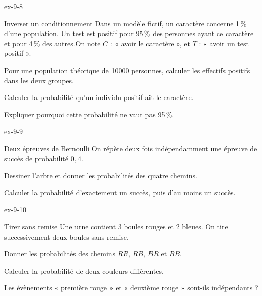 \begin{blocLivre}{ex-9-8}
\begin{exercice}[2]{Inverser un conditionnement}
Dans un modèle fictif, un caractère concerne 1\,\% d’une population. Un test est positif pour 95\,\% des personnes ayant ce caractère et pour 4\,\% des autres.On note $C$ : « avoir le caractère », et $T$ : « avoir un test positif ».\begin{questions}
\item Pour une population théorique de 10000 personnes, calculer les effectifs positifs dans les deux groupes.
\item Calculer la probabilité qu’un individu positif ait le caractère.
\item Expliquer pourquoi cette probabilité ne vaut pas 95\,\%.
\end{questions}
\label{figlivre-r09-08-ex}

\end{exercice}
\end{blocLivre}
\begin{blocLivre}{ex-9-9}
\begin{exercice}[2]{Deux épreuves de Bernoulli}
On répète deux fois indépendamment une épreuve de succès de probabilité $0{,}4$.\begin{questions}
\item Dessiner l’arbre et donner les probabilités des quatre chemins.
\item Calculer la probabilité d’exactement un succès, puis d’au moins un succès.
\end{questions}
\label{figlivre-r09-09-ex}

\end{exercice}
\end{blocLivre}
\begin{blocLivre}{ex-9-10}
\begin{exercice}[2]{Tirer sans remise}
Une urne contient 3 boules rouges et 2 bleues. On tire successivement deux boules sans remise.\begin{questions}
\item Donner les probabilités des chemins $RR$, $RB$, $BR$ et $BB$.
\item Calculer la probabilité de deux couleurs différentes.
\item Les évènements « première rouge » et « deuxième rouge » sont-ils indépendants ?
\end{questions}
\label{figlivre-r09-10-ex}

\end{exercice}
\end{blocLivre}
